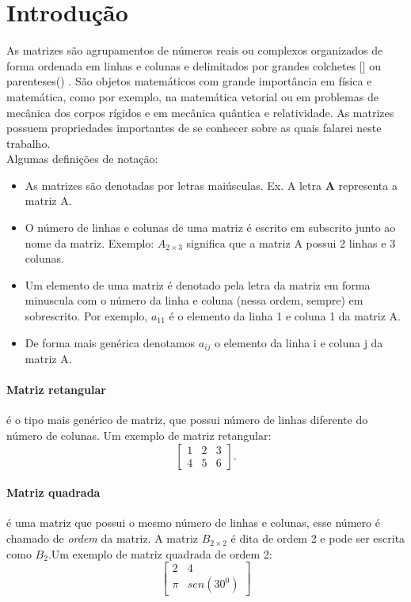 \section{Introdução}
As matrizes são agrupamentos de números reais ou complexos organizados de forma ordenada em linhas e colunas e delimitados por grandes colchetes [] ou parenteses() . São objetos matemáticos com grande importância em física e matemática, como por exemplo, na matemática vetorial ou em problemas de mecânica dos corpos rígidos e em mecânica quântica e relatividade. As matrizes possuem propriedades importantes de se conhecer sobre as quais falarei neste trabalho.\\
Algumas definições de notação:
\begin{itemize}
  \item As matrizes são denotadas por letras maiúsculas. Ex. A letra \textbf{A} representa a matriz A.
  \item O número de linhas e colunas de uma matriz é escrito em subscrito junto ao nome da matriz. Exemplo: $A_{2\times3}$ significa que a matriz A possui 2 linhas e 3 colunas.
  \item Um elemento de uma matriz é denotado pela letra da matriz em forma minuscula com o número da linha e coluna (nessa ordem, sempre) em sobrescrito. Por exemplo, $a_{11}$ é o elemento da linha 1 e coluna 1 da matriz A.
  \item De forma mais genérica denotamos $a_{ij}$ o elemento da linha i e coluna j da matriz A.
\end{itemize}  

\paragraph*{Matriz retangular} é o tipo mais genérico de matriz, que possui número de linhas diferente do número de colunas. Um exemplo de matriz retangular:
\begin{displaymath}
\begin{bmatrix}
  1 & 2 & 3 \\  4 & 5 & 6
\end{bmatrix}.
\end{displaymath}

\paragraph*{Matriz quadrada} é uma matriz que possui o mesmo número de linhas e colunas, esse número é chamado de \textit{ordem} da matriz. A matriz $B_{2\times2}$ é dita de ordem 2 e pode ser escrita como $B_{2}$.Um exemplo de matriz quadrada de ordem 2:
\begin{displaymath}
\begin{bmatrix}
  2 & 4 \\ \pi & sen(30^0)
\end{bmatrix}
\end{displaymath}
